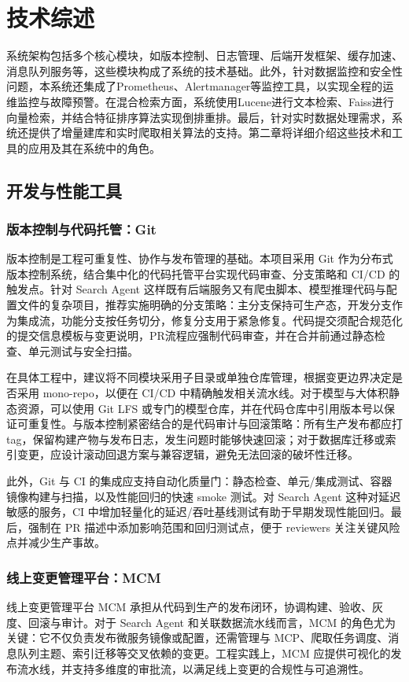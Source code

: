 \chapter{技术综述}
系统架构包括多个核心模块，如版本控制、日志管理、后端开发框架、缓存加速、消息队列服务等，这些模块构成了系统的技术基础。此外，针对数据监控和安全性问题，本系统还集成了Prometheus、Alertmanager等监控工具，以实现全程的运维监控与故障预警。在混合检索方面，系统使用Lucene进行文本检索、Faiss进行向量检索，并结合特征排序算法实现倒排重排。最后，针对实时数据处理需求，系统还提供了增量建库和实时爬取相关算法的支持。第二章将详细介绍这些技术和工具的应用及其在系统中的角色。
\section{开发与性能工具} 

\subsection{版本控制与代码托管：Git}
版本控制是工程可重复性、协作与发布管理的基础。本项目采用 Git\cite{German2016Continuously} 作为分布式版本控制系统，结合集中化的代码托管平台实现代码审查、分支策略和 CI/CD 的触发点。针对 Search Agent 这样既有后端服务又有爬虫脚本、模型推理代码与配置文件的复杂项目，推荐实施明确的分支策略：主分支保持可生产态，开发分支作为集成流，功能分支按任务切分，修复分支用于紧急修复。代码提交须配合规范化的提交信息模板与变更说明，PR流程应强制代码审查，并在合并前通过静态检查、单元测试与安全扫描。

在具体工程中，建议将不同模块采用子目录或单独仓库管理，根据变更边界决定是否采用 mono-repo，以便在 CI/CD 中精确触发相关流水线。对于模型与大体积静态资源，可以使用 Git LFS 或专门的模型仓库，并在代码仓库中引用版本号以保证可重复性。与版本控制紧密结合的是代码审计与回滚策略：所有生产发布都应打 tag，保留构建产物与发布日志，发生问题时能够快速回滚；对于数据库迁移或索引变更，应设计滚动回退方案与兼容逻辑，避免无法回滚的破坏性迁移。

此外，Git 与 CI 的集成应支持自动化质量门：静态检查、单元/集成测试、容器镜像构建与扫描，以及性能回归的快速 smoke 测试。对 Search Agent 这种对延迟敏感的服务，CI 中增加轻量化的延迟/吞吐基线测试有助于早期发现性能回归。最后，强制在 PR 描述中添加影响范围和回归测试点，便于 reviewers 关注关键风险点并减少生产事故。

\subsection{线上变更管理平台：MCM}
线上变更管理平台 MCM\cite{Meituan2023ChangeRisk} 承担从代码到生产的发布闭环，协调构建、验收、灰度、回滚与审计。对于 Search Agent 和关联数据流水线而言，MCM 的角色尤为关键：它不仅负责发布微服务镜像或配置，还需管理与 MCP、爬取任务调度、消息队列主题、索引迁移等交叉依赖的变更。工程实践上，MCM 应提供可视化的发布流水线，并支持多维度的审批流，以满足线上变更的合规性与可追溯性。

